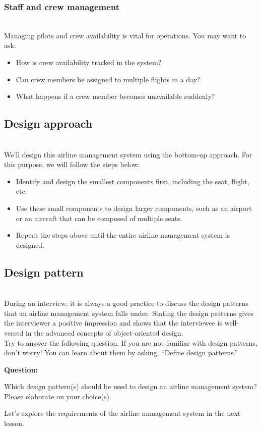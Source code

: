 \subsubsection{Staff and crew management}\label{XUj2h4Yw1hNSz7fd7BOR5}
\\
Managing pilots and crew availability is vital for operations. You may want to ask:

\begin{itemize}
\item
\protect{}\label{OqcKHlhV_84gU5XqVOar9}
How is crew availability tracked in the system?
\item
\protect{}\label{HunjEM3ageULf71s9J8yR}
Can crew members be assigned to multiple flights in a day?
\item
\protect{}\label{mje0pZhjgUk3f1N-CmYge}
What happens if a crew member becomes unavailable suddenly?
\end{itemize}

\subsection{Design approach}\label{nf4nt6YzKOQV2im_KzbAe}
\\
We'll design this airline management system using the bottom-up approach. For this purpose, we will follow the steps below:

\begin{itemize}
\item
Identify and design the smallest components first, including the seat, flight, etc.
\item
Use these small components to design larger components, such as an airport or an aircraft that can be composed of multiple seats.
\item
\protect{}\label{5wKV0fxaBgn54tRtFwdan}
Repeat the steps above until the entire airline management system is designed.
\end{itemize}

\subsection{Design pattern~}\label{RkUk9f5tCVw9Mt0XSGqOi}
\\
During an interview, it is always a good practice to discuss the design patterns that an airline management system falls under. Stating the design patterns gives the interviewer a positive impression and shows that the interviewee is well-versed in the advanced concepts of object-oriented design.
\\
Try to answer the following question. If you are not familiar with design patterns, don't worry! You can learn about them by asking, ``Define design patterns.''

\textbf{Question:}

Which design pattern(s) should be used to design an airline management system? Please elaborate on your choice(s).

Let's explore the requirements of the airline management system in the next lesson.

\subsection{}\label{bkBnriBdAM2Y-JRWZ9S2F}

